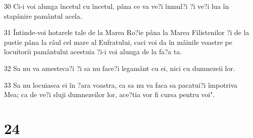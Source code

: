 \par 30 Ci-i voi alunga încetul cu încetul, pâna ce va ve?i înmul?i ?i ve?i lua în stapânire pamântul acela.
\par 31 Întinde-voi hotarele tale de la Marea Ro?ie pâna la Marea Filistenilor ?i de la pustie pâna la râul cel mare al Eufratului, caci voi da în mâinile voastre pe locuitorii pamântului acestuia ?i-i voi alunga de la fa?a ta.
\par 32 Sa nu va amesteca?i ?i sa nu face?i legamânt cu ei, nici cu dumnezeii lor.
\par 33 Sa nu locuiasca ei în ?ara voastra, ca sa nu va faca sa pacatui?i împotriva Mea; ca de ve?i sluji dumnezeilor lor, ace?tia vor fi cursa pentru voi".

\chapter{24}

